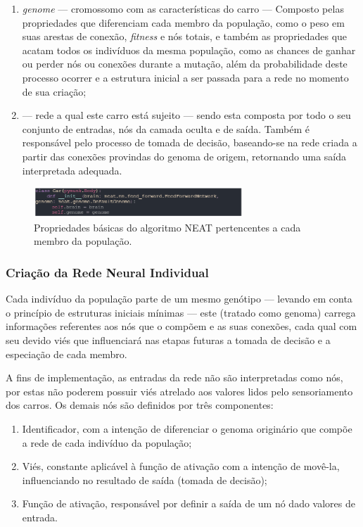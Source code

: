 \begin{enumerate}
	\item \textit{genome} — cromossomo com as características do carro — Composto pelas propriedades que diferenciam cada membro da população, como o peso em suas arestas de conexão, \textit{fitness} e nós totais, e também as propriedades que acatam todos os indivíduos da mesma população, como as chances de ganhar ou perder nós ou conexões durante a mutação, além da probabilidade deste processo ocorrer e a estrutura inicial a ser passada para a rede no momento de sua criação; 
	\item {} —  rede a qual este carro está sujeito — sendo esta composta por todo o seu conjunto de entradas, nós da camada oculta e de saída. Também é responsável pelo processo de tomada de decisão, baseando-se na rede criada a partir das conexões provindas do genoma de origem, retornando uma saída interpretada adequada.
\end{enumerate}

\begin{figure}[htb]
        \centering
        \caption{\label{fig_DA}Propriedades básicas do algoritmo NEAT pertencentes a cada membro da população.}
        \includegraphics[width=0.7\textwidth]{images/DA.png}
\end{figure}

\subsubsection{Criação da Rede Neural Individual}
Cada indivíduo da população parte de um mesmo genótipo — levando em conta o princípio de estruturas iniciais mínimas — este (tratado como genoma) carrega informações referentes aos nós que o compõem e as suas conexões, cada qual com seu devido viés que influenciará nas etapas futuras a tomada de decisão e a especiação de cada membro.

A fins de implementação, as entradas da rede não são interpretadas como nós, por estas não poderem possuir viés atrelado aos valores lidos pelo sensoriamento dos carros. Os demais nós são definidos por três componentes: 

\begin{enumerate}
	\item Identificador, com a intenção de diferenciar o genoma originário que compõe a rede de cada indivíduo da população;
	\item Viés, constante aplicável à função de ativação com a intenção de movê-la, influenciando no resultado de saída (tomada de decisão);
	\item Função de ativação, responsável por definir a saída de um nó dado valores de entrada.
\end{enumerate}

